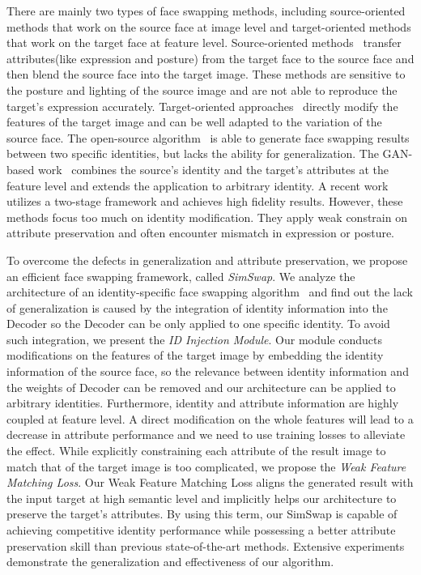 \documentclass[sigconf]{acmart}
\begin{document}
There are mainly two types of face swapping methods, including source-oriented methods that work on the source face at image level and target-oriented methods that work on the target face at feature level.
Source-oriented methods~\cite{DBLP:Blanz,DBLP:Dimitri,DBLP:Nirkin,DBLP:FSGAN} transfer attributes(like expression and posture) from the target face to the source face and then blend the source face into the target image. These methods are sensitive to the posture and lighting of the source image and are not able to reproduce the target's expression accurately.
Target-oriented approaches~\cite{DeepFakes,DBLP:Korshunova,DBLP:Identity,DBLP:FaceShifter} directly modify the features of the target image and can be well adapted to the variation of the source face. 
The open-source algorithm~\cite{DeepFakes} is able to generate face swapping results between two specific identities, but lacks the ability for generalization. The GAN-based work~\cite{DBLP:Identity} combines the source's identity and the target's attributes at the feature level and extends the application to arbitrary identity. A recent work~\cite{DBLP:FaceShifter} utilizes a two-stage framework and achieves high fidelity results. However, these methods focus too much on identity modification. They apply weak constrain on attribute preservation and often encounter mismatch in expression or posture.

To overcome the defects in generalization and attribute preservation, we propose an efficient face swapping framework, called \emph{SimSwap}. We analyze the architecture of an identity-specific face swapping algorithm~\cite{DeepFakes} and find out the lack of generalization is caused by the integration of identity information into the Decoder so the Decoder can be only applied to one specific identity. To avoid such integration, we present the \textit{ID Injection Module}. Our module conducts modifications on the features of the target image by embedding the identity information of the source face, so the relevance between identity information and the weights of Decoder can be removed and our architecture can be applied to arbitrary identities. Furthermore, identity and attribute information are highly coupled at feature level. A direct modification on the whole features will lead to a decrease in attribute performance and we need to use training losses to alleviate the effect. While explicitly constraining each attribute of the result image to match that of the target image is too complicated, we propose the \textit{Weak Feature Matching Loss}. Our Weak Feature Matching Loss aligns the generated result with the input target at high semantic level and implicitly helps our architecture to preserve the target's attributes. By using this term, our SimSwap is capable of achieving competitive identity performance while possessing a better attribute preservation skill than previous state-of-the-art methods. Extensive experiments demonstrate the generalization and effectiveness of our algorithm.
\end{document}
